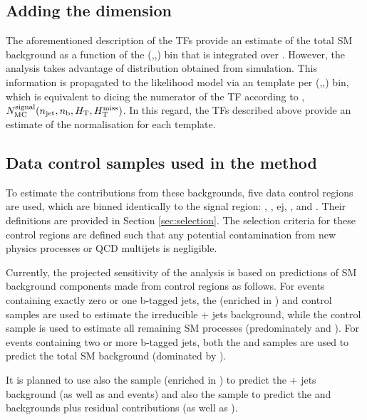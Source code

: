 \clearpage

\subsection{Adding the \mht dimension}

The aforementioned description of the TFs provide an estimate of the
total SM background as a function of the (\njet,\nb,\HT) bin that is
integrated over \mht. However, the analysis takes advantage of \mht
distribution obtained from simulation. This information is propagated
to the likelihood model via an \mht template per (\njet,\nb,\HT) bin,
which is equivalent to dicing the numerator of the TF according to
\mht, \ie $N_{\rm MC}^{\rm signal}(n_{\text{jet}},n_{\text{b}},\mbox{$H_\text{T}$},\mbox{$H_{\rm T}^{\rm miss}$})$. In this
regard, the TFs described above provide an estimate of the
normalisation for each \mht template.

\subsection{Data control samples used in the method}

To estimate the contributions from these backgrounds, five data
control regions are used, which are binned identically to the signal
region: \mj, \mmj, ej, \eej, and \gj. Their definitions are provided
in Section \ref{sec:selection}. The selection criteria for these
control regions are defined such that any potential contamination from
new physics processes or QCD multijets is negligible.

Currently, the projected sensitivity of the analysis is based on
predictions of SM background components made from control regions as
follows. For events containing exactly zero or one b-tagged jets, the
\ej (enriched in \wej) and \gj control samples are used to estimate
the irreducible \znunu + jets background, while the \mj control sample
is used to estimate all remaining SM processes (predominately \wj and
\ttbar). For events containing two or more b-tagged jets, both the \mj
and \ej samples are used to predict the total SM background (dominated
by \ttbar). 

It is planned to use also the \mj sample (enriched in \wmj) to predict
the \znunu + jets background (as well as \wej and \gj events) and also
the \ej sample to predict the \wj and \ttbar backgrounds plus residual
contributions (as well as \mj).


